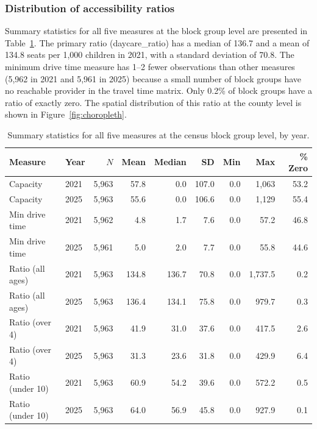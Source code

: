 \documentclass{CUP-JNL-DAP}%
\begin{document}
\subsubsection{Distribution of accessibility ratios}

Summary statistics for all five measures at the block group level are presented in Table~\ref{tab:summary}. The primary ratio (daycare\_ratio) has a median of 136.7 and a mean of 134.8 seats per 1{,}000 children in 2021, with a standard deviation of 70.8. The minimum drive time measure has 1--2 fewer observations than other measures (5,962 in 2021 and 5,961 in 2025) because a small number of block groups have no reachable provider in the travel time matrix. Only 0.2\% of block groups have a ratio of exactly zero. The spatial distribution of this ratio at the county level is shown in Figure~\ref{fig:choropleth}.

\begin{table}[!htbp]
\centering
\caption{Summary statistics for all five measures at the census block group level, by year.}
\label{tab:summary}
\small
\begin{tabular}{llrrrrrrr}
\toprule
Measure & Year & $N$ & Mean & Median & SD & Min & Max & \% Zero \\
\midrule
Capacity & 2021 & 5{,}963 & 57.8 & 0.0 & 107.0 & 0.0 & 1{,}063 & 53.2 \\
Capacity & 2025 & 5{,}963 & 55.6 & 0.0 & 106.6 & 0.0 & 1{,}129 & 55.4 \\
Min drive time & 2021 & 5{,}962 & 4.8 & 1.7 & 7.6 & 0.0 & 57.2 & 46.8 \\
Min drive time & 2025 & 5{,}961 & 5.0 & 2.0 & 7.7 & 0.0 & 55.8 & 44.6 \\
Ratio (all ages) & 2021 & 5{,}963 & 134.8 & 136.7 & 70.8 & 0.0 & 1{,}737.5 & 0.2 \\
Ratio (all ages) & 2025 & 5{,}963 & 136.4 & 134.1 & 75.8 & 0.0 & 979.7 & 0.3 \\
Ratio (over 4) & 2021 & 5{,}963 & 41.9 & 31.0 & 37.6 & 0.0 & 417.5 & 2.6 \\
Ratio (over 4) & 2025 & 5{,}963 & 31.3 & 23.6 & 31.8 & 0.0 & 429.9 & 6.4 \\
Ratio (under 10) & 2021 & 5{,}963 & 60.9 & 54.2 & 39.6 & 0.0 & 572.2 & 0.5 \\
Ratio (under 10) & 2025 & 5{,}963 & 64.0 & 56.9 & 45.8 & 0.0 & 927.9 & 0.1 \\
\bottomrule
\end{tabular}
\end{table}
\end{document}
